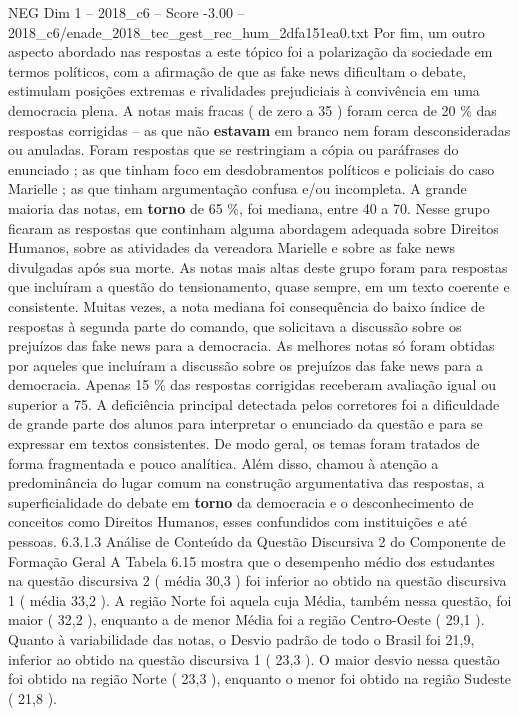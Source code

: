 \begin{textsample}{NEG Dim 1 – 2018\_c6 – Score -3.00 – 2018\_c6/enade\_2018\_tec\_gest\_rec\_hum\_2dfa151ea0.txt}
Por fim, um outro aspecto abordado nas respostas a este tópico foi a polarização da sociedade em termos políticos, com a afirmação de que as fake news dificultam o debate, estimulam posições extremas e rivalidades prejudiciais à convivência em uma democracia plena.
A notas mais fracas ( de zero a 35 ) foram cerca de 20 \% das respostas corrigidas – as que não \textbf{estavam} em branco nem foram desconsideradas ou anuladas.
Foram respostas que se restringiam a cópia ou paráfrases do enunciado ; as que tinham foco em desdobramentos políticos e policiais do caso Marielle ; as que tinham argumentação confusa e/ou incompleta.
A grande maioria das notas, em \textbf{torno} de 65 \%, foi mediana, entre 40 a 70.
Nesse grupo ficaram as respostas que continham alguma abordagem adequada sobre Direitos Humanos, sobre as atividades da vereadora Marielle e sobre as fake news divulgadas após sua morte.
As notas mais altas deste grupo foram para respostas que incluíram a questão do tensionamento, quase sempre, em um texto coerente e consistente.
Muitas vezes, a nota mediana foi consequência do baixo índice de respostas à segunda parte do comando, que solicitava a discussão sobre os prejuízos das fake news para a democracia.
As melhores notas só foram obtidas por aqueles que incluíram a discussão sobre os prejuízos das fake news para a democracia.
Apenas 15 \% das respostas corrigidas receberam avaliação igual ou superior a 75.
A deficiência principal detectada pelos corretores foi a dificuldade de grande parte dos alunos para interpretar o enunciado da questão e para se expressar em textos consistentes.
De modo geral, os temas foram tratados de forma fragmentada e pouco analítica.
Além disso, chamou à atenção a predominância do lugar comum na construção argumentativa das respostas, a superficialidade do debate em \textbf{torno} da democracia e o desconhecimento de conceitos como Direitos Humanos, esses confundidos com instituições e até pessoas. 6.3.1.3 Análise de Conteúdo da Questão Discursiva 2 do Componente de Formação Geral A Tabela 6.15 mostra que o desempenho médio dos estudantes na questão discursiva 2 ( média 30,3 ) foi inferior ao obtido na questão discursiva 1 ( média 33,2 ).
A região Norte foi aquela cuja Média, também nessa questão, foi maior ( 32,2 ), enquanto a de menor Média foi a região Centro-Oeste ( 29,1 ).
Quanto à variabilidade das notas, o Desvio padrão de todo o Brasil foi 21,9, inferior ao obtido na questão discursiva 1 ( 23,3 ).
O maior desvio nessa questão foi obtido na região Norte ( 23,3 ), enquanto o menor foi obtido na região Sudeste ( 21,8 ).

\end{textsample}
